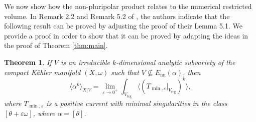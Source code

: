 \documentclass[a4paper]{amsart}
\renewcommand{\epsilon}{\varepsilon}
\newcommand{\reg}{{\operatorname{reg}}}
\newtheorem{theorem}{Theorem}[section]
\theoremstyle{definition}
\begin{document}
We now show how the non-pluripolar product relates to the numerical restricted volume. In Remark 2.2 and Remark 5.2 of \cite{RestrictedVol}, the authors indicate that the following result can be proved by adjusting the proof of their Lemma 5.1. We provide a proof in order to show that it can be proved by adapting the ideas in the proof of Theorem \ref{thm:main}.
\begin{theorem}\label{thm: rvol}
   If $V$ is an irreducible $k$-dimensional analytic subvariety of the compact K\"ahler manifold $(X, \omega)$ such that $V\nsubseteq E_{\operatorname{nn}}(\alpha)$, then
\[\langle\alpha^k\rangle_{X|V} = \lim_{\epsilon \to 0^+} \int_{V_\reg} \langle (T_{\min, \epsilon}|_{V_\reg})^k\rangle,\]
where $T_{\min, \epsilon}$ is a positive current with minimal singularities in the class $[\theta + \epsilon\omega]$, where $\alpha = [\theta]$.
\end{theorem}
\end{document}
